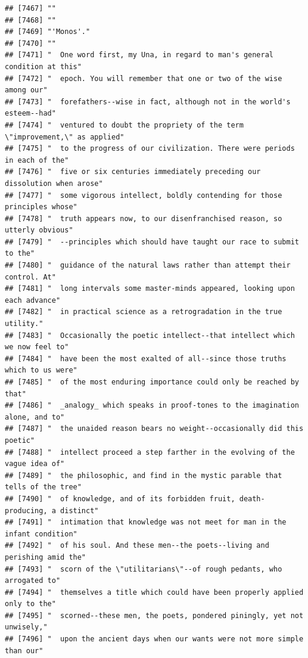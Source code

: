\documentclass{article}\usepackage[]{graphicx}\usepackage[]{color}
\makeatletter
\newenvironment{kframe}{%
 \def\at@end@of@kframe{}%
 \ifinner\ifhmode%
  \def\at@end@of@kframe{\end{minipage}}%
  \begin{minipage}{\columnwidth}%
 \fi\fi%
 \def\FrameCommand##1{\hskip\@totalleftmargin \hskip-\fboxsep
 \colorbox{shadecolor}{##1}\hskip-\fboxsep
     \hskip-\linewidth \hskip-\@totalleftmargin \hskip\columnwidth}%
 \MakeFramed {\advance\hsize-\width
   \@totalleftmargin\z@ \linewidth\hsize
   \@setminipage}}%
 {\par\unskip\endMakeFramed%
 \at@end@of@kframe}
\newenvironment{knitrout}{}{} %
\makeatother
\begin{document}
\begin{knitrout}
\begin{kframe}
\begin{verbatim}
## [7467] ""                                                                            
## [7468] ""                                                                            
## [7469] "'Monos'."                                                                    
## [7470] ""                                                                            
## [7471] "  One word first, my Una, in regard to man's general condition at this"      
## [7472] "  epoch. You will remember that one or two of the wise among our"            
## [7473] "  forefathers--wise in fact, although not in the world's esteem--had"        
## [7474] "  ventured to doubt the propriety of the term \"improvement,\" as applied"   
## [7475] "  to the progress of our civilization. There were periods in each of the"    
## [7476] "  five or six centuries immediately preceding our dissolution when arose"    
## [7477] "  some vigorous intellect, boldly contending for those principles whose"     
## [7478] "  truth appears now, to our disenfranchised reason, so utterly obvious"      
## [7479] "  --principles which should have taught our race to submit to the"           
## [7480] "  guidance of the natural laws rather than attempt their control. At"        
## [7481] "  long intervals some master-minds appeared, looking upon each advance"      
## [7482] "  in practical science as a retrogradation in the true utility."             
## [7483] "  Occasionally the poetic intellect--that intellect which we now feel to"    
## [7484] "  have been the most exalted of all--since those truths which to us were"    
## [7485] "  of the most enduring importance could only be reached by that"             
## [7486] "  _analogy_ which speaks in proof-tones to the imagination alone, and to"    
## [7487] "  the unaided reason bears no weight--occasionally did this poetic"          
## [7488] "  intellect proceed a step farther in the evolving of the vague idea of"     
## [7489] "  the philosophic, and find in the mystic parable that tells of the tree"    
## [7490] "  of knowledge, and of its forbidden fruit, death-producing, a distinct"     
## [7491] "  intimation that knowledge was not meet for man in the infant condition"    
## [7492] "  of his soul. And these men--the poets--living and perishing amid the"      
## [7493] "  scorn of the \"utilitarians\"--of rough pedants, who arrogated to"         
## [7494] "  themselves a title which could have been properly applied only to the"     
## [7495] "  scorned--these men, the poets, pondered piningly, yet not unwisely,"       
## [7496] "  upon the ancient days when our wants were not more simple than our"        

\end{verbatim}
\end{kframe}
\end{knitrout}
\end{document}
